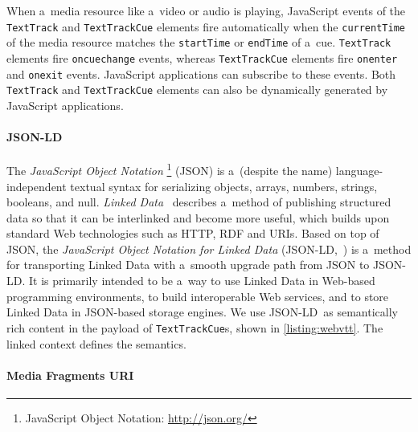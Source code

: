 \documentclass{sig-alternate}
\newcommand{\inlinelistingsize}{\fontsize{8pt}{11pt}}
\let\oldurl\url
\renewcommand{\url}[1]{\inlinelistingsize\oldurl{#1}}
\def\JSONLD{\mbox{JSON-LD}}
\begin{document}
When a~media resource like a~video or audio is playing,
JavaScript events of the \texttt{TextTrack} and \texttt{TextTrackCue}
elements fire automatically when the \texttt{currentTime}
of the media resource matches the
\texttt{startTime} or \texttt{endTime} of a~cue.
\texttt{TextTrack} elements fire \texttt{oncuechange} events,
whereas \texttt{TextTrackCue} elements fire
\texttt{onenter} and \texttt{onexit} events.
JavaScript applications can subscribe to these events.
Both \texttt{TextTrack} and \texttt{TextTrackCue} elements
can also be dynamically generated by JavaScript applications.

\paragraph{\JSONLD}

The \emph{JavaScript Object Notation}%
\footnote{JavaScript Object Notation: \url{http://json.org/}}
(JSON)
is a~(despite the name) language-independent textual syntax
for serializing objects, arrays, numbers, strings, booleans, and null.
\emph{Linked Data}~\cite{bizer2009linkeddata}
describes a~method of publishing structured data
so that it can be interlinked and become more useful,
which builds upon standard Web technologies such as HTTP, RDF and URIs.
Based on top of JSON, the
\emph{JavaScript Object Notation for Linked Data}
(\JSONLD,~\cite{sporny2013jsonld}) is a~method for transporting
Linked Data with a~smooth upgrade path from JSON to \JSONLD.
It is primarily intended to be a~way to use
Linked Data in Web-based programming environments,
to build interoperable Web services,
and to store Linked Data in JSON-based storage engines.
We use \JSONLD\ as semantically rich content
in the payload of \texttt{TextTrackCue}s, shown in
\autoref{listing:webvtt}.
The linked context defines the semantics.

\paragraph{Media Fragments URI}
\end{document}
